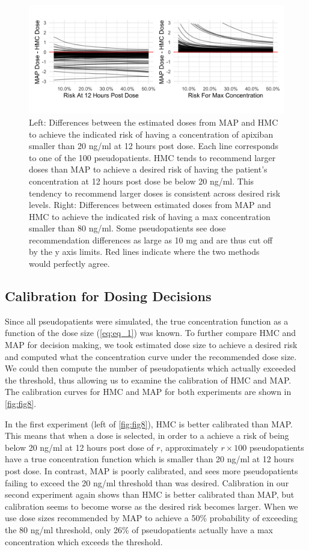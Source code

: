\begin{figure}[h!]
	\centering
	\includegraphics[width=\linewidth]{figs/experiments}
	\caption{Left: Differences between the estimated doses from MAP and HMC to achieve the indicated risk of having a concentration of apixiban smaller than 20 ng/ml at 12 hours post dose. Each line corresponds to one of the 100 pseudopatients. HMC tends to recommend larger doses than MAP to achieve a desired risk of having the patient's concentration at 12 hours post dose be below 20 ng/ml. This tendency to recommend larger doses is consistent across desired risk levels.  Right: Differences between estimated doses from MAP and HMC to achieve the indicated risk of having a max concentration smaller than 80 ng/ml.  Some pseudopatients see dose recommendation differences as large as 10 mg and are thus cut off by the y axis limits. Red lines indicate where the two methods would perfectly agree.}
	\label{fig:fig7}
\end{figure}


\subsection*{Calibration for Dosing Decisions}

Since all pseudopatients were simulated, the true concentration function as a function of the dose size (\cref{eq:eq_1}) was known.  To further compare HMC and MAP for decision making, we took estimated dose size to achieve a desired risk and computed what the concentration curve under the recommended dose size.  We could then compute the number of pseudopatients which actually exceeded the threshold, thus allowing us to examine the calibration of HMC and MAP.  The calibration curves for HMC and MAP for both experiments are shown in \cref{fig:fig8}.

In the first experiment (left of \cref{fig:fig8}), HMC is better calibrated than MAP.  This means that when a dose is selected, in order to a achieve a risk of being below 20 ng/ml at 12 hours post dose of $r$, approximately $r \times 100$ pseudopatients have a true concentration function which is smaller than 20 ng/ml at 12 hours post dose. In contrast, MAP is poorly calibrated, and sees more pseudopatients failing to exceed the 20 ng/ml threshold than was desired.  Calibration in our second experiment again shows than HMC is better calibrated than MAP, but calibration seems to become worse as the desired risk becomes larger.  When we use dose sizes recommended by MAP to achieve a 50\% probability of exceeding the 80 ng/ml threshold, only 26\% of pseudopatients actually have a max concentration which exceeds the threshold.



